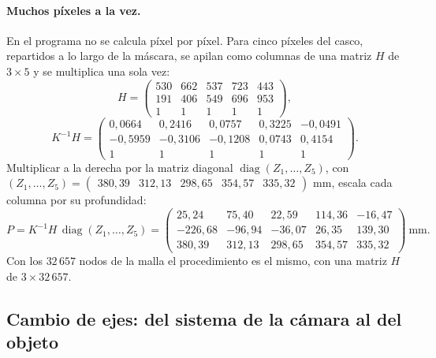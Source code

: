 \paragraph{Muchos píxeles a la vez.} En el programa no se calcula píxel por píxel. Para cinco píxeles del casco, repartidos
a lo largo de la máscara, se apilan como columnas de una matriz $H$ de $3\times5$ y se multiplica una sola vez:
\begin{equation}
H=\begin{pmatrix} 530 & 662 & 537 & 723 & 443 \\ 191 & 406 & 549 & 696 & 953 \\ 1 & 1 & 1 & 1 & 1 \end{pmatrix},
\end{equation}
\begin{equation}
K^{-1}H=\begin{pmatrix} 0{,}0664 & 0{,}2416 & 0{,}0757 & 0{,}3225 & -0{,}0491 \\ -0{,}5959 & -0{,}3106 & -0{,}1208 & 0{,}0743 & 0{,}4154 \\ 1 & 1 & 1 & 1 & 1 \end{pmatrix} .
\end{equation}
Multiplicar a la derecha por la matriz diagonal $\operatorname{diag}(Z_1,\dots,Z_5)$, con
$(Z_1,\dots,Z_5)=\begin{pmatrix} 380{,}39 & 312{,}13 & 298{,}65 & 354{,}57 & 335{,}32 \end{pmatrix}$ mm, escala cada columna por su profundidad:
\begin{equation}
P=K^{-1}H\,\operatorname{diag}(Z_1,\dots,Z_5)=\begin{pmatrix} 25{,}24 & 75{,}40 & 22{,}59 & 114{,}36 & -16{,}47 \\ -226{,}68 & -96{,}94 & -36{,}07 & 26{,}35 & 139{,}30 \\ 380{,}39 & 312{,}13 & 298{,}65 & 354{,}57 & 335{,}32 \end{pmatrix}\ \text{mm}.
\end{equation}
Con los $32\,657$ nodos de la malla el procedimiento es el mismo, con una matriz $H$ de $3\times32\,657$.

\subsection{Cambio de ejes: del sistema de la cámara al del objeto}\label{sec:casco-ejes}


